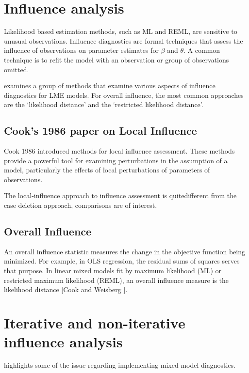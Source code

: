\documentclass[12pt, a4paper]{article}
\begin{document}
\section{Influence analysis} %

Likelihood based estimation methods, such as ML and REML, are sensitive to unusual observations. Influence diagnostics are formal techniques that assess the influence of observations on parameter estimates for $\beta$ and $\theta$. A common technique is to refit the model with an observation or group of observations omitted.

\citet{west} examines a group of methods that examine various aspects of influence diagnostics for LME models.
For overall influence, the most common approaches are the `likelihood distance' and the `restricted likelihood distance'.

\subsection{Cook's 1986 paper on Local Influence}%
Cook 1986 introduced methods for local influence assessment. These methods provide a powerful tool for examining perturbations in the assumption of a model, particularly the effects of local perturbations of parameters of observations.

The local-influence approach to influence assessment is quitedifferent from the case deletion approach, comparisons are of
interest.



\subsection{Overall Influence}
An overall influence statistic measures the change in the objective function being minimized. For example, in
OLS regression, the residual sums of squares serves that purpose. In linear mixed models fit by
 maximum likelihood (ML) or  restricted maximum likelihood (REML), an overall influence measure is the  likelihood distance [Cook and Weisberg ].


\section{Iterative and non-iterative influence analysis} %
\citet{schabenberger} highlights some of the issue regarding implementing mixed model diagnostics.
\end{document}
